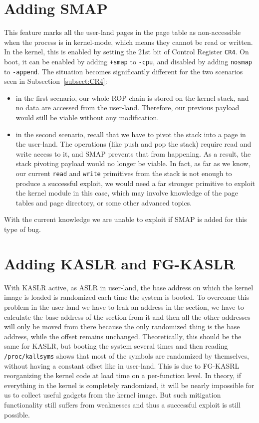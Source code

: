 \documentclass{masterthesis}
\newcommand{\refToSubSection}[1]{Subsection~\ref{subsect:#1}\xspace}
\begin{document}
\section{Adding SMAP}
\label{sect:addSmap}
This feature marks all the user-land pages in the page table as non-accessible when the process is in kernel-mode, which means they cannot be read or written.
In the kernel, this is enabled by setting the 21st bit of Control Register \texttt{CR4}.
On boot, it can be enabled by adding \texttt{+smap} to \texttt{-cpu}, and disabled by adding \texttt{nosmap} to \texttt{-append}.
The situation becomes significantly different for the two scenarios seen in \refToSubSection{CR4}:
\begin{itemize}
\item in the first scenario, our whole ROP chain is stored on the kernel stack, and no data are accessed from the user-land. Therefore, our previous payload would still be viable without any modification.
\item in the second scenario, recall that we have to pivot the stack into a page in the user-land. The operations (like push and pop the stack) require read and write access to it, and SMAP prevents that from happening. As a result, the stack pivoting payload would no longer be viable. In fact, as far as we know, our current \texttt{read} and \texttt{write} primitives from the stack is not enough to produce a successful exploit, we would need a far stronger primitive to exploit the kernel module in this case, which may involve knowledge of the page tables and page directory, or some other advanced topics. 
\end{itemize}
With the current knowledge we are unable to exploit if SMAP is added for this type of bug.
\section{Adding KASLR and FG-KASLR}
\label{sect:kaslr-fg-kaslr}
With KASLR active, as ASLR in user-land, the base address on which the kernel image is loaded is randomized each time the system is booted.
To overcome this problem in the user-land we have to leak an address in the section, we have to calculate the base address of the section from it and then all the other addresses will only be moved from there because the only randomized thing is the base address, while the offset remains unchanged.
Theoretically, this should be the same for KASLR, but booting the system several times and then reading \texttt{/proc/kallsyms} shows that most of the symbols are randomized by themselves, without having a constant offset like in user-land.
This is due to FG-KASRL reorganizing the kernel code at load time on a per-function level.
In theory, if everything in the kernel is completely randomized, it will be nearly impossible for us to collect useful gadgets from the kernel image. But such mitigation functionality still suffers from weaknesses and thus a successful exploit is still possible.
\end{document}
